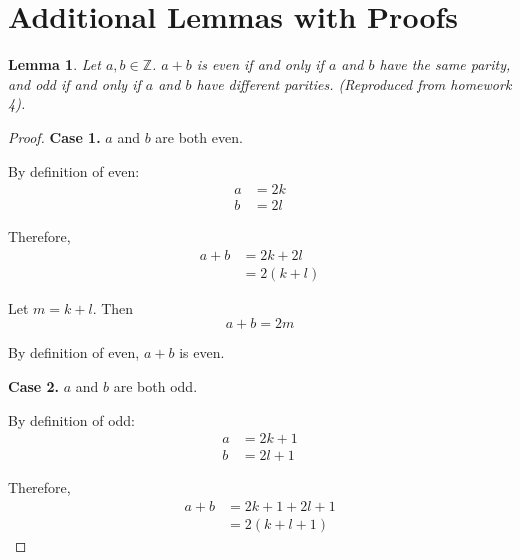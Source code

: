 \documentclass{article}
\newtheorem{lemma}{Lemma}
\begin{document}
\section{Additional Lemmas with Proofs}

\begin{lemma}
    \label{thm:evenlemma}
    Let $a, b \in \mathbb{Z}$. $a + b$ is even if and only if $a$ and $b$ have the same parity, and odd if and only if $a$ and $b$ have different parities. (Reproduced from homework 4).
\end{lemma}
    
\begin{proof}
    
    \textbf{Case 1.} $a$ and $b$ are both even.

    By definition of even:
    \begin{equation}
        \begin{aligned}
            a &= 2k \\ 
            b &= 2l
        \end{aligned}
    \end{equation}

    Therefore,
    \begin{equation}
        \begin{aligned}
            a + b &= 2k + 2l \\
            &= 2(k + l) 
        \end{aligned}
    \end{equation}

    Let $m = k + l$. Then
    \begin{equation}
        a + b = 2m
    \end{equation}

    By definition of even, $a + b$ is even.  
   
    \textbf{Case 2.} $a$ and $b$ are both odd.

    By definition of odd:
    \begin{equation}
        \begin{aligned}
            a &= 2k + 1 \\
            b &= 2l + 1
        \end{aligned}
    \end{equation}

    Therefore, 
    \begin{equation}
        \begin{aligned}
            a + b &= 2k + 1 + 2l + 1 \\ 
            &= 2(k + l + 1) 
        \end{aligned}
    \end{equation}


\end{proof}
\end{document}
